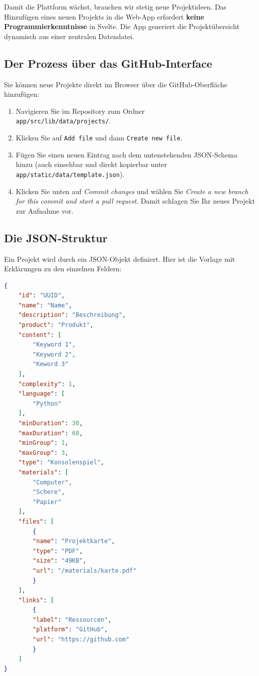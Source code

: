 \documentclass[a5paper,pagesize,10pt,bibtotoc,pointlessnumbers,
normalheadings,DIV=9,twoside=false]{scrbook}
\begin{document}
Damit die Plattform wächst, brauchen wir stetig neue Projektideen. Das Hinzufügen eines neuen Projekts in die Web-App erfordert \textbf{keine Programmierkenntnisse} in Svelte. Die App generiert die Projektübersicht dynamisch aus einer zentralen Datendatei.

\subsection*{Der Prozess über das GitHub-Interface}
Sie können neue Projekte direkt im Browser über die GitHub-Oberfläche hinzufügen:

\begin{enumerate}
    \item Navigieren Sie im Repository zum Ordner\\ \texttt{app/src/lib/data/projects/}.
    \item Klicken Sie auf \texttt{Add file} und dann \texttt{Create new file}.
    \item Fügen Sie einen neuen Eintrag nach dem untenstehenden JSON-Schema hinzu (auch einsehbar und direkt kopierbar unter \texttt{app/static/data/template.json}).
    \item Klicken Sie unten auf \textit{Commit changes} und wählen Sie \textit{Create a new branch for this commit and start a pull request}. Damit schlagen Sie Ihr neues Projekt zur Aufnahme vor.
\end{enumerate}

\subsection*{Die JSON-Struktur}
Ein Projekt wird durch ein JSON-Objekt definiert. Hier ist die Vorlage mit Erklärungen zu den einzelnen Feldern:

\begin{lstlisting}[language=json]
{
	"id": "UUID",
	"name": "Name",
	"description": "Beschreibung",
	"product": "Produkt",
	"content": [
		"Keyword 1",
		"Keyword 2",
		"Keword 3"
	],
	"complexity": 1,
	"language": [
        "Python"
    ],
	"minDuration": 30,
	"maxDuration": 60,
	"minGroup": 1,
	"maxGroup": 3,
	"type": "Konsolenspiel",
	"materials": [
		"Computer",
		"Schere",
		"Papier"
	],
    "files": [
		{
		"name": "Projektkarte",
		"type": "PDF",
		"size": "49KB",
		"url": "/materials/karte.pdf"
		}
	],
	"links": [
		{
		"label": "Ressourcen",
		"platform": "GitHub",
		"url": "https://github.com"
		}
	]
}
\end{lstlisting}
\end{document}
